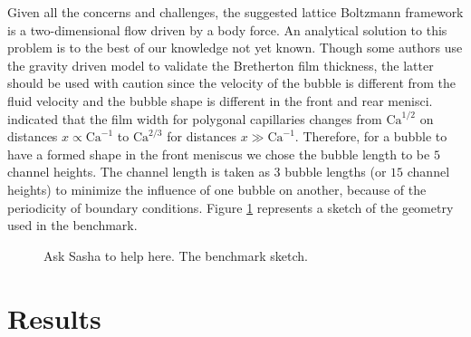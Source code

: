 \documentclass{article}
\newcommand{\Ca}{\mathrm{Ca}}
\begin{document}
Given all the concerns and challenges, the suggested lattice Boltzmann framework
is a two-dimensional flow driven by a body force.  An analytical
solution to this problem is to the best of our knowledge not yet known.
Though some authors \cite{sehgal-microchannel} use the gravity driven model to
validate the Bretherton film thickness, the latter should be used with caution
since the velocity of the bubble is different from the fluid velocity and the
bubble shape
is different in the front and rear menisci. \citet{wong-films} indicated that the
film width for polygonal capillaries
changes from $\Ca^{1/2}$ on distances $x\propto \Ca^{-1}$ to $\Ca^{2/3}$ for
distances $x \gg \Ca^{-1}$. Therefore, for a bubble to have a formed shape in
the  front meniscus we chose the bubble length to be $5$ channel heights. The
channel length is taken  as $3$ bubble lengths (or $15$ channel heights)
to minimize the influence of one bubble on another,
because of the periodicity of boundary conditions.
Figure \ref{fig:benchmark:sketch} represents a sketch of the geometry
used in the benchmark.
\begin{figure}
\caption{{\color{red} Ask Sasha to help here. The benchmark sketch.}
\label{fig:benchmark:sketch}}
\end{figure}


\section{Results}
\end{document}
